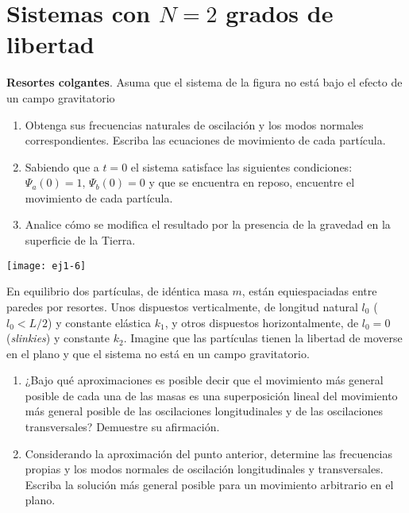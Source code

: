 \section*{Sistemas con \(N= 2\) grados de libertad}

\item
\begin{minipage}[t][5cm]{0.75\textwidth}
\textbf{Resortes colgantes}.
Asuma que el sistema de la figura no está bajo el efecto de un campo gravitatorio
\begin{enumerate}
	\item Obtenga sus frecuencias naturales de oscilación y los modos normales correspondientes.
	Escriba las ecuaciones de movimiento de cada partícula.
	\item Sabiendo que a $t= 0$ el sistema satisface las siguientes condiciones: $\Psi_a(0)= 1, \, \Psi_b(0)= 0$ y que se encuentra en reposo, encuentre el movimiento de cada partícula.
	\item Analice cómo se modifica el resultado por la presencia de la gravedad en la superficie de la Tierra.
\end{enumerate}
\end{minipage}
\begin{minipage}[c][0cm][t]{0.2\textwidth}
	\texttt{[image: ej1-6]}
\end{minipage}



\item
\begin{minipage}[t][3.1cm]{0.6\textwidth}
En equilibrio dos partículas, de idéntica masa $m$, están equiespaciadas entre paredes por resortes. 
Unos dispuestos verticalmente, de longitud natural $l_0$ ($l_0< L/2$) y constante elástica $k_1$, y otros dispuestos horizontalmente, de $l_0= 0$ (\emph{slinkies}) y constante $k_2$.
Imagine que las partículas tienen la libertad de moverse en el plano y que el sistema no está en un campo gravitatorio.
\end{minipage}
\begin{minipage}[c][2.2cm][t]{0.35\textwidth}
\begingroup
	
\endgroup
\end{minipage}
\begin{enumerate}
	\item ¿Bajo qué aproximaciones es posible decir que el movimiento más general posible de cada una de las masas es una superposición lineal del movimiento más general posible de las oscilaciones longitudinales y de las oscilaciones transversales?
	Demuestre su afirmación.
	\item Considerando la aproximación del punto anterior, determine las frecuencias propias y los modos normales de oscilación longitudinales y transversales.
	Escriba la solución más general posible para un movimiento arbitrario en el plano.
\end{enumerate}



